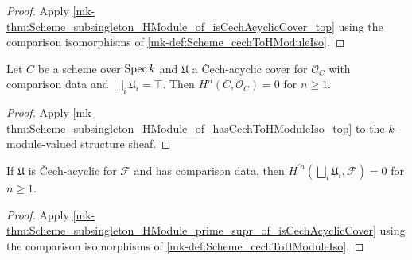 \begin{proof}
  \leanok


Apply \ref{mk-thm:Scheme_subsingleton_HModule_of_isCechAcyclicCover_top} using the comparison isomorphisms of \ref{mk-def:Scheme_cechToHModuleIso}.
\end{proof}

\begin{theorem}\label{mk-thm:Scheme_subsingleton_HModule_of_hasCechToHModuleIso_top_curve}
  \leanok


  Let \(C\) be a scheme over \(\operatorname{Spec} k\) and \(\mathfrak U\) a \v{C}ech-acyclic cover for \(\mathcal O_C\) with comparison data and \(\bigsqcup_i\mathfrak U_i=\top\). Then \(H^n(C,\mathcal O_C)=0\) for \(n\geq1\).
\end{theorem}

\begin{proof}
  \leanok


Apply \ref{mk-thm:Scheme_subsingleton_HModule_of_hasCechToHModuleIso_top} to the \(k\)-module-valued structure sheaf.
\end{proof}

\begin{theorem}\label{mk-thm:Scheme_subsingleton_HModule_prime_supr_of_hasCechToHModuleIso}
  \leanok


  If \(\mathfrak U\) is \v{C}ech-acyclic for \(\mathcal F\) and has comparison data, then \(H^{\prime n}(\bigsqcup_i\mathfrak U_i,\mathcal F)=0\) for \(n\geq1\).
\end{theorem}

\begin{proof}
  \leanok


Apply \ref{mk-thm:Scheme_subsingleton_HModule_prime_supr_of_isCechAcyclicCover} using the comparison isomorphisms of \ref{mk-def:Scheme_cechToHModuleIso}.
\end{proof}

